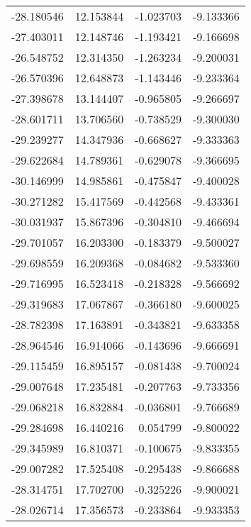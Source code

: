 \begin{tabular}{rrrr}
      -28.180546 &        12.153844 &   -1.023703 &  -9.133366 \\
      -27.403011 &        12.148746 &   -1.193421 &  -9.166698 \\
      -26.548752 &        12.314350 &   -1.263234 &  -9.200031 \\
      -26.570396 &        12.648873 &   -1.143446 &  -9.233364 \\
      -27.398678 &        13.144407 &   -0.965805 &  -9.266697 \\
      -28.601711 &        13.706560 &   -0.738529 &  -9.300030 \\
      -29.239277 &        14.347936 &   -0.668627 &  -9.333363 \\
      -29.622684 &        14.789361 &   -0.629078 &  -9.366695 \\
      -30.146999 &        14.985861 &   -0.475847 &  -9.400028 \\
      -30.271282 &        15.417569 &   -0.442568 &  -9.433361 \\
      -30.031937 &        15.867396 &   -0.304810 &  -9.466694 \\
      -29.701057 &        16.203300 &   -0.183379 &  -9.500027 \\
      -29.698559 &        16.209368 &   -0.084682 &  -9.533360 \\
      -29.716995 &        16.523418 &   -0.218328 &  -9.566692 \\
      -29.319683 &        17.067867 &   -0.366180 &  -9.600025 \\
      -28.782398 &        17.163891 &   -0.343821 &  -9.633358 \\
      -28.964546 &        16.914066 &   -0.143696 &  -9.666691 \\
      -29.115459 &        16.895157 &   -0.081438 &  -9.700024 \\
      -29.007648 &        17.235481 &   -0.207763 &  -9.733356 \\
      -29.068218 &        16.832884 &   -0.036801 &  -9.766689 \\
      -29.284698 &        16.440216 &    0.054799 &  -9.800022 \\
      -29.345989 &        16.810371 &   -0.100675 &  -9.833355 \\
      -29.007282 &        17.525408 &   -0.295438 &  -9.866688 \\
      -28.314751 &        17.702700 &   -0.325226 &  -9.900021 \\
      -28.026714 &        17.356573 &   -0.233864 &  -9.933353 \\

\end{tabular}
